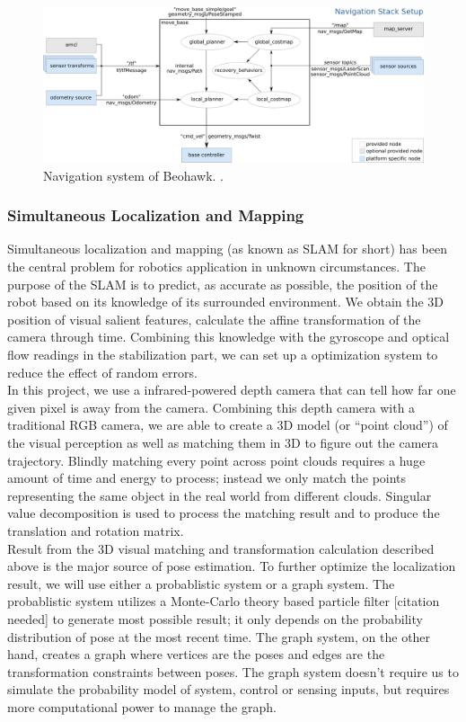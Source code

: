 \documentclass[12pt, letterpaper]{article}
\begin{document}
\begin{figure}[h]
\centering
\includegraphics[width=12cm]{images/overview_tf.png}
\caption{Navigation system of Beohawk. .} 
\label{fig:navi}
\end{figure}

\subsubsection{Simultaneous Localization and Mapping}

Simultaneous localization and mapping (as known as SLAM for short) has been the central problem for robotics application in unknown circumstances. The purpose of the SLAM is to predict, as accurate as possible, the position of the robot based on its knowledge of its surrounded environment. We obtain the 3D position of visual salient features, calculate the affine transformation of the camera through time. Combining this knowledge with the gyroscope and optical flow readings in the stabilization part, we can set up a optimization system to reduce the effect of random errors.
\\
In this project, we use a infrared-powered depth camera that can tell how far one given pixel is away from the camera. Combining this depth camera with a traditional RGB camera, we are able to create a 3D model (or “point cloud”) of the visual perception as well as matching them in 3D to figure out the camera trajectory. Blindly matching every point across point clouds requires a huge amount of time and energy to process; instead we only match the points representing the same object in the real world from different clouds. Singular value decomposition is used to process the matching result and to produce the translation and rotation matrix.
\\
Result from the 3D visual matching and transformation calculation described above is the major source of pose estimation. To further optimize the localization result, we will use either a probablistic system or a graph system. The probablistic system utilizes a Monte-Carlo theory based particle filter [citation needed] to generate most possible result; it only depends on the probability distribution of pose at the most recent time. The graph system, on the other hand, creates a graph where vertices are the poses and edges are the transformation constraints between poses. The graph system doesn't require us to simulate the probability model of system, control or sensing inputs, but requires more computational power to manage the graph.
\end{document}
